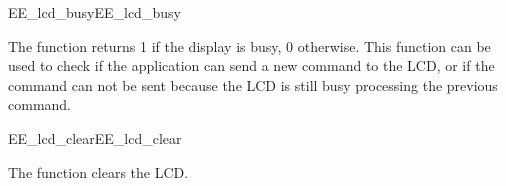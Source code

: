 \begin{function_nopb2}{EE\_lcd\_busy}{EE_lcd_busy}
  
  \begin{fundescription}
    The function returns 1 if the display is busy, 0 otherwise. This
    function can be used to check if the application can send a new
    command to the LCD, or if the command can not be sent because the
    LCD is still busy processing the previous command.
  \end{fundescription}
  
  
  \begin{funreturn}
  \end{funreturn}
  
\end{function_nopb2}

\begin{function_nopb2}{EE\_lcd\_clear}{EE_lcd_clear}
  
  \begin{fundescription}
    The function clears the LCD.
  \end{fundescription}
  
  
  
\end{function_nopb2}

